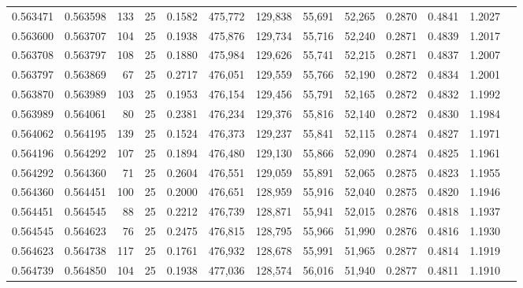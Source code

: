 \begin{tabular}{rrrrrrrrrrrrr}
0.563471 & 0.563598 &   133 &  25 &                                     0.1582 & 475,772 & 129,838 &  55,691 &  52,265 & 0.2870 & 0.4841 & 1.2027 \\
0.563600 & 0.563707 &   104 &  25 &                                     0.1938 & 475,876 & 129,734 &  55,716 &  52,240 & 0.2871 & 0.4839 & 1.2017 \\
0.563708 & 0.563797 &   108 &  25 &                                     0.1880 & 475,984 & 129,626 &  55,741 &  52,215 & 0.2871 & 0.4837 & 1.2007 \\
0.563797 & 0.563869 &    67 &  25 &                                     0.2717 & 476,051 & 129,559 &  55,766 &  52,190 & 0.2872 & 0.4834 & 1.2001 \\
0.563870 & 0.563989 &   103 &  25 &                                     0.1953 & 476,154 & 129,456 &  55,791 &  52,165 & 0.2872 & 0.4832 & 1.1992 \\
0.563989 & 0.564061 &    80 &  25 &                                     0.2381 & 476,234 & 129,376 &  55,816 &  52,140 & 0.2872 & 0.4830 & 1.1984 \\
0.564062 & 0.564195 &   139 &  25 &                                     0.1524 & 476,373 & 129,237 &  55,841 &  52,115 & 0.2874 & 0.4827 & 1.1971 \\
0.564196 & 0.564292 &   107 &  25 &                                     0.1894 & 476,480 & 129,130 &  55,866 &  52,090 & 0.2874 & 0.4825 & 1.1961 \\
0.564292 & 0.564360 &    71 &  25 &                                     0.2604 & 476,551 & 129,059 &  55,891 &  52,065 & 0.2875 & 0.4823 & 1.1955 \\
0.564360 & 0.564451 &   100 &  25 &                                     0.2000 & 476,651 & 128,959 &  55,916 &  52,040 & 0.2875 & 0.4820 & 1.1946 \\
0.564451 & 0.564545 &    88 &  25 &                                     0.2212 & 476,739 & 128,871 &  55,941 &  52,015 & 0.2876 & 0.4818 & 1.1937 \\
0.564545 & 0.564623 &    76 &  25 &                                     0.2475 & 476,815 & 128,795 &  55,966 &  51,990 & 0.2876 & 0.4816 & 1.1930 \\
0.564623 & 0.564738 &   117 &  25 &                                     0.1761 & 476,932 & 128,678 &  55,991 &  51,965 & 0.2877 & 0.4814 & 1.1919 \\
0.564739 & 0.564850 &   104 &  25 &                                     0.1938 & 477,036 & 128,574 &  56,016 &  51,940 & 0.2877 & 0.4811 & 1.1910 \\

\end{tabular}
